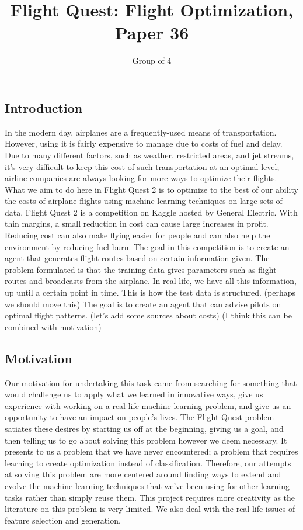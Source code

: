\documentclass{article}[12pt]
\renewenvironment{abstract}
  {\center
  {\bfseries{\large\abstractname}}}
  {\center}
\begin{document}
\title{Flight Quest: Flight Optimization, Paper 36}
\author{
	Group of 4
}
\date{}
\maketitle

\begin{abstract}
\end{abstract}
\setlength{\columnsep}{1cm}
\begin{multicols}{2}

\section{Introduction}
In the modern day, airplanes are a frequently-used means of transportation. However, using it is fairly expensive to manage due to costs of fuel and delay. Due to many different factors, such as weather, restricted areas, and jet streams, it's very difficult to keep this cost of such transportation at an optimal level; airline companies are always looking for more ways to optimize their flights. What we aim to do here in Flight Quest 2 is to optimize to the best of our ability the costs of airplane flights using machine learning techniques on large sets of data. Flight Quest 2 is a competition on Kaggle hosted by General Electric. With thin margins, a small reduction in cost can cause large increases in profit. Reducing cost can also make flying easier for people and can also help the environment by reducing fuel burn. The goal in this competition is to create an agent that generates flight routes based on certain information given. The problem formulated is that the training data gives parameters such as flight routes and broadcasts from the airplane. In real life, we have all this information, up until a certain point in time. This is how the test data is structured. (perhaps we should move this) The goal is to create an agent that can advise pilots on optimal flight patterns. (let's add some sources about costs) (I think this can be combined with motivation)

\subsection{Motivation}
Our motivation for undertaking this task came from searching for something that would challenge us to apply what we learned in innovative ways, give us experience with working on a real-life machine learning problem, and give us an opportunity to have an impact on people's lives. The Flight Quest problem satiates these desires by starting us off at the beginning, giving us a goal, and then telling us to go about solving this problem however we deem necessary. It presents to us a problem that we have never encountered; a problem that requires learning to create optimization instead of classification. Therefore, our attempts at solving this problem are more centered around finding ways to extend and evolve the machine learning techniques that we've been using for other learning tasks rather than simply reuse them. This project requires more creativity as the literature on this problem is very limited. We also deal with the real-life issues of feature selection and generation. 
 

\end{multicols}
\end{document}
